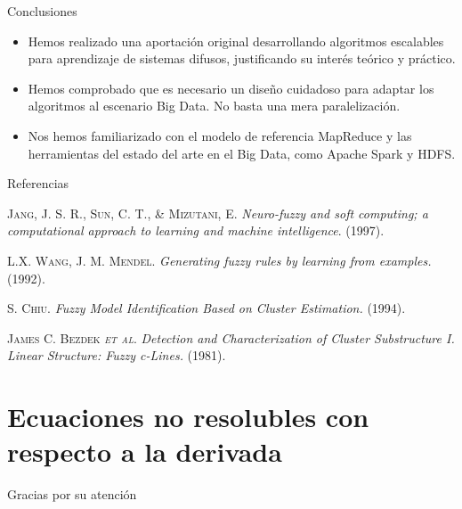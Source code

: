 \documentclass[10pt, spanish]{beamer}
\begin{document}
\begin{frame}{Conclusiones}
    \begin{itemize}[<+->]
      \item Hemos realizado una aportación original desarrollando algoritmos escalables para aprendizaje de sistemas difusos, justificando su interés teórico y práctico.
      \item Hemos comprobado que es necesario un diseño cuidadoso para adaptar los algoritmos al escenario Big Data. No basta una mera paralelización.
      \item Nos hemos familiarizado con el modelo de referencia MapReduce y las herramientas del estado del arte en el Big Data, como Apache Spark y HDFS.
    \end{itemize}
\end{frame}

\begin{frame}{Referencias}
\begin{thebibliography}{9}

  \textsc{Jang, J. S. R., Sun, C. T., \& Mizutani, E}. \textit{Neuro-fuzzy and soft computing; a computational approach to learning and machine intelligence}. (1997).

\textsc{L.X. Wang, J. M. Mendel}. \textit{Generating fuzzy rules by learning from examples.} (1992).

\textsc{S. Chiu}. \textit{Fuzzy Model Identification Based on Cluster Estimation.} (1994).

\textsc{James C. Bezdek \textit{et al}}. \textit{Detection and Characterization of Cluster Substructure I. Linear Structure: Fuzzy c-Lines.} (1981).


\end{thebibliography}
\end{frame}

\section{Ecuaciones no resolubles con respecto a la derivada}




\begin{frame}[standout]
Gracias por su atención
\end{frame}
\end{document}
